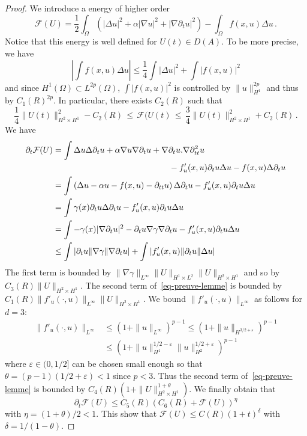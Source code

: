\documentclass[AHL,Unicode,longabstracts]{cedram}
\newcommand{\Fc}{\mathcal{F}}
\newcommand{\grad}{\nabla}
\begin{document}
\begin{proof}
We introduce a energy of higher order
\[
\Fc(U)=\frac 12 \int_\Omega \left(|\Delta u|^2 + \alpha|\grad u|^2 +
|\grad \partial_t u|^2\right) - \int_\Omega f(x,u)\Delta u\,.
\]
Notice that this energy is well defined for $U(t)\in D(A)$. To be more precise, we have
\[
\left|\int f(x,u)\Delta u \right| \leq \frac 14 \int |\Delta u|^2 + \int
|f(x,u)|^2
\]
and since $H^1(\Omega)\subset L^{2p}(\Omega)$, $\int |f(x,u)|^2$ is controlled by $\|u\|_{H^1}^{2p}$ and thus by $C_1(R)^{2p}$. In particular, there exists $C_2(R)$ such that
\[
\frac 14 \|U(t)\|_{H^2\times H^1}^2 - C_2(R)\,\leq\,\Fc(U(t)\,\leq\,\frac 34
\|U(t)\|_{H^2\times H^1}^2 + C_2(R)\,.
\]
We have
\begin{equation}\label{eq-preuve-lemme}
\begin{aligned}
\partial_t \Fc(U)&=\int \Delta u\Delta \partial_tu + \alpha \grad u\grad\partial_t u + \grad\partial_tu.\grad\partial_{tt}^2 u\\
&\mkern250mu- f'_{u}(x,u)\partial_t u \Delta u - f(x,u) \Delta\partial_t u \\
&= \int \left(\Delta u - \alpha u - f(x,u) -\partial_{tt}u\right)\Delta\partial_t u - f'_{u}(x,u)\partial_t u \Delta u \\\
&= \int \gamma(x)\partial_t u \Delta\partial_t u - f'_{u}(x,u)\partial_t u \Delta u\\
&= \int - \gamma(x) |\grad\partial_t u|^2 - \partial_t u \grad \gamma\grad
\partial_t u - f'_{u}(x,u)\partial_t u \Delta u\\
&\leq \int |\partial_t u\|\grad \gamma\|\grad
\partial_t u| + \int |f'_{u}(x,u)\|\partial_t u\|\Delta u|
\end{aligned}
\end{equation}
The first term is bounded by $\|\grad\gamma\|_{L^\infty}\|U\|_{H^1\times L^2}\|U\|_{H^2\times H^1}$ and so by $C_3(R)\|U\|_{H^2\times H^1}$. The second term of~\eqref{eq-preuve-lemme} is bounded by $C_1(R) \|f'_u(\cdot,u)\|_{L^\infty} \|U\|_{H^2\times H^1}$. We bound $\|f'_u(\cdot,u)\|_{L^\infty}$ as follows for $d=3$:
\begin{align*}
\|f'_u(\cdot,u)\|_{L^\infty}&\leq (1+\|u\|_{L^\infty})^{p-1} \leq (1+\|u\|_{H^{3/2+\varepsilon}})^{p-1}\\
&\leq \left(1+\|u\|_{H^1}^{1/2-\varepsilon}\|u\|_{H^2}^{1/2+\varepsilon}\right)^{p-1}
\end{align*}
where $\varepsilon\in (0,1/2]$ can be chosen small enough so that $\theta=(p-1)(1/2+\varepsilon)<1$ since $p<3$. Thus the second term of~\eqref{eq-preuve-lemme} is bounded by $C_4(R)(1+\|U\|_{H^2\times H^1}^{1+\theta})$. We finally obtain that
\[
\partial_t \Fc(U) \leq C_5(R) (C_6(R) + \Fc(U))^\eta
\]
with $\eta=(1+\theta)/2<1$. This show that $\Fc(U)\leq C(R) (1+t)^\delta$ with $\delta=1/(1-\theta)$.


\end{proof}
\end{document}
